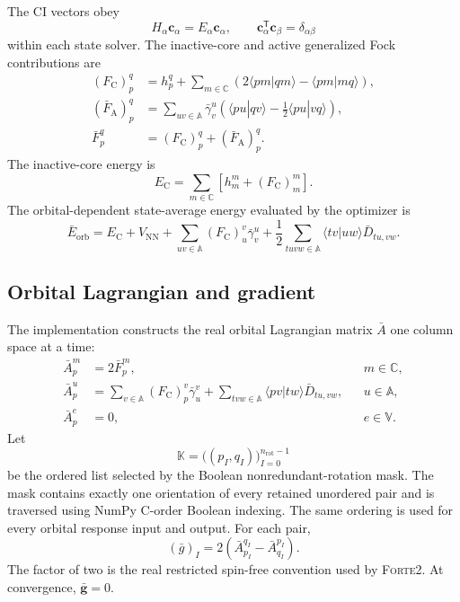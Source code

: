 \documentclass[aip,preprint,nofootinbib]{revtex4-1}
\newcommand{\forte}{\textsc{Forte2}\xspace}
\newcommand{\core}{\mathrm{C}}
\newcommand{\act}{\mathrm{A}}
\begin{document}
The CI vectors obey
\begin{equation}
 H_\alpha\mathbf c_\alpha=E_\alpha\mathbf c_\alpha,
 \qquad
 \mathbf c_\alpha^{\mathsf T}\mathbf c_\beta=\delta_{\alpha\beta}
\end{equation}
within each state solver.  The inactive-core and active generalized Fock
contributions are
\begin{align}
 (F_{\core})^q_p
 &=h^q_p+\sum_{m\in\mathbb C}
 \left(2\langle pm|qm\rangle-\langle pm|mq\rangle\right),
 \label{eq:nr-fock-core}
 \\
 (\bar F_{\act})^q_p
 &=\sum_{uv\in\mathbb A}\bar\gamma^u_v
 \left(\langle pu|qv\rangle-\frac12\langle pu|vq\rangle\right),
 \label{eq:nr-fock-active}
 \\
 \bar F^q_p&=(F_{\core})^q_p+(\bar F_{\act})^q_p.
\end{align}
The inactive-core energy is
\begin{equation}
 E_{\core}=\sum_{m\in\mathbb C}
 \left[h^m_m+(F_{\core})^m_m\right].
\end{equation}
The orbital-dependent state-average energy evaluated by the optimizer is
\begin{equation}
 \bar E_{\mathrm{orb}}
 =E_{\core}+V_{\mathrm{NN}}
 +\sum_{uv\in\mathbb A}(F_{\core})^v_u\bar\gamma^u_v
 +\frac12\sum_{tuvw\in\mathbb A}
 \langle tv|uw\rangle\bar D_{tu,vw}.
\end{equation}

\subsection{Orbital Lagrangian and gradient}

The implementation constructs the real orbital Lagrangian matrix $\bar A$
one column space at a time:
\begin{align}
 \bar A^m_p&=2\bar F^m_p,
 &&m\in\mathbb C,
 \label{eq:nr-orbital-lagrangian-core}
 \\
 \bar A^u_p
 &=\sum_{v\in\mathbb A}(F_{\core})^v_p\bar\gamma^v_u
 +\sum_{tvw\in\mathbb A}\langle pv|tw\rangle\bar D_{tu,vw},
 &&u\in\mathbb A,
 \label{eq:nr-orbital-lagrangian-active}
 \\
 \bar A^e_p&=0,
 &&e\in\mathbb V.
\end{align}
Let
\begin{equation}
 \mathbb K=\big((p_I,q_I)\big)_{I=0}^{n_{\mathrm{rot}}-1}
 \label{eq:nr-pair-order}
\end{equation}
be the ordered list selected by the Boolean nonredundant-rotation mask.  The
mask contains exactly one orientation of every retained unordered pair and
is traversed using NumPy C-order Boolean indexing.  The same ordering is used
for every orbital response input and output.  For each pair,
\begin{equation}
 (\bar g)_I
 =2\left(\bar A^{q_I}_{p_I}-\bar A^{p_I}_{q_I}\right).
 \label{eq:nr-orbital-gradient}
\end{equation}
The factor of two is the real restricted spin-free convention used by
\forte.  At convergence, $\bar{\mathbf g}=0$.
\end{document}
